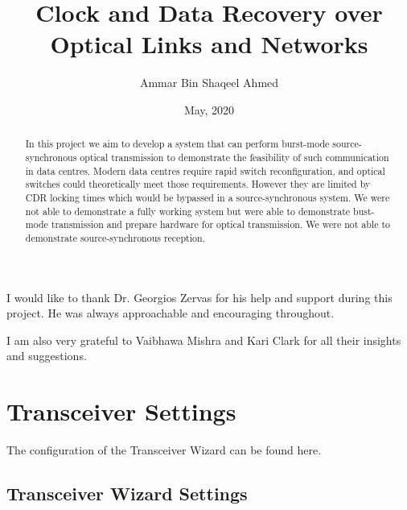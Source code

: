 \documentclass[oneside]{discothesis}
\title{Clock and Data Recovery over Optical Links and Networks}
\author{Ammar Bin Shaqeel Ahmed}
\institute{University College London}
\date{May, 2020}
\begin{document}
\frontmatter %
\maketitle
\cleardoublepage

\begin{acknowledgements}
I would like to thank Dr. Georgios Zervas for his help and support during this
project. He was always approachable and encouraging throughout.

\noindent
I am also very grateful to Vaibhawa Mishra and Kari Clark for all their
insights and suggestions.  
\end{acknowledgements}

\begin{abstract}
In this project we aim to develop a system that can perform burst-mode
source-synchronous optical transmission to demonstrate the feasibility of
such communication in data centres. Modern data centres require
rapid switch reconfiguration, and optical switches could theoretically meet
those requirements. However they are limited by CDR locking times which would be
bypassed in a source-synchronous system.  We were not able to demonstrate a
fully working system but were able to demonstrate bust-mode transmission and
prepare hardware for optical transmission. We were not able to demonstrate
source-synchronous reception.


\end{abstract}

\tableofcontents

\mainmatter %










\appendix
\chapter{Transceiver Settings}%
\label{cha:transceiver_settings}
The configuration of the Transceiver Wizard can be found here.

\section{Transceiver Wizard Settings}%
\label{sec:transceiver_wizard_settings}
\end{document}
